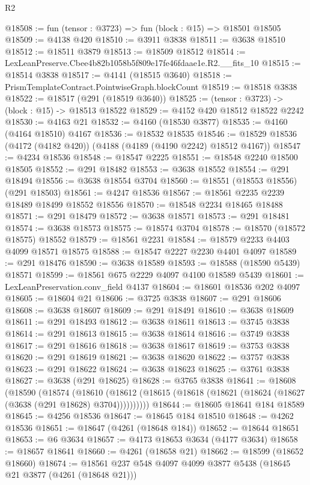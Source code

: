 \begin{lexlean}{R2}
\begin{coremodule}
@18508 := fun (tensor : @3723) => fun (block : @15) => @18501 @18505
@18509 := @4138 @420
@18510 := @3911 @3838
@18511 := @3638 @18510
@18512 := @18511 @3879
@18513 := @18509 @18512
@18514 := LexLeanPreserve.Cbee4b82b1058b5f809e17fe46fdaae1e.R2.__fits_10
@18515 := @18514 @3838
@18517 := @4141 (@18515 @3640)
@18518 := PrismTemplateContract.PointwiseGraph.blockCount
@18519 := @18518 @3838
@18522 := @18517 (@291 (@18519 @3640))
@18525 := (tensor : @3723) -> (block : @15) -> @18513 @18522
@18529 := @4152 @420 @18512 @18522 @2242
@18530 := @4163 @21
@18532 := @4160 (@18530 @3877)
@18535 := @4160 (@4164 @18510) @4167
@18536 := @18532 @18535
@18546 := @18529 @18536 (@4172 (@4182 @420)) (@4188 (@4189 (@4190 @2242) @18512 @4167))
@18547 := @4234 @18536
@18548 := @18547 @2225
@18551 := @18548 @2240 @18500 @18505
@18552 := @291 @18482
@18553 := @3638 @18552
@18554 := @291 @18494
@18556 := @3638 @18554 @3704
@18560 := @18551 (@18553 @18556) (@291 @18503)
@18561 := @4247 @18536
@18567 := @18561 @2235 @2239 @18489 @18499 @18552 @18556
@18570 := @18548 @2234 @18465 @18488
@18571 := @291 @18479
@18572 := @3638 @18571
@18573 := @291 @18481
@18574 := @3638 @18573
@18575 := @18574 @3704
@18578 := @18570 (@18572 @18575) @18552
@18579 := @18561 @2231
@18584 := @18579 @2233 @4403 @4099 @18571 @18575
@18588 := @18547 @2227 @2230 @4401 @4097
@18589 := @291 @18476
@18590 := @3638 @18589
@18593 := @18588 (@18590 @5439) @18571
@18599 := @18561 @675 @2229 @4097 @4100 @18589 @5439
@18601 := LexLeanPreservation.conv_field @4137
@18604 := @18601 @18536 @202 @4097
@18605 := @18604 @21
@18606 := @3725 @3838
@18607 := @291 @18606
@18608 := @3638 @18607
@18609 := @291 @18491
@18610 := @3638 @18609
@18611 := @291 @18493
@18612 := @3638 @18611
@18613 := @3745 @3838
@18614 := @291 @18613
@18615 := @3638 @18614
@18616 := @3749 @3838
@18617 := @291 @18616
@18618 := @3638 @18617
@18619 := @3753 @3838
@18620 := @291 @18619
@18621 := @3638 @18620
@18622 := @3757 @3838
@18623 := @291 @18622
@18624 := @3638 @18623
@18625 := @3761 @3838
@18627 := @3638 (@291 @18625)
@18628 := @3765 @3838
@18641 := @18608
    (@18590
      (@18574
        (@18610 (@18612 (@18615 (@18618 (@18621 (@18624 (@18627 (@3638 (@291 @18628) @3704))))))))))
@18644 := @18605 @18641 @184 @18589
@18645 := @4256 @18536
@18647 := @18645 @184 @18510
@18648 := @4262 @18536
@18651 := @18647 (@4261 (@18648 @184))
@18652 := @18644 @18651
@18653 := @6 @3634
@18657 := @4173 @18653 @3634 (@4177 @3634)
@18658 := @18657 @18641
@18660 := @4261 (@18658 @21)
@18662 := @18599 (@18652 @18660)
@18674 := @18561 @237 @548 @4097 @4099 @3877 @5438 (@18645 @21 @3877 (@4261 (@18648 @21)))

\end{coremodule}
\end{lexlean}
